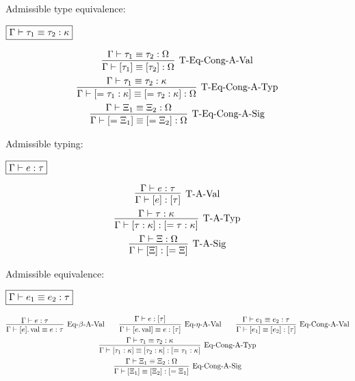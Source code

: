 Admissible type equivalence:

$\fbox{$\Gamma \vdash \tau_1 \equiv \tau_2: \kappa$}$

\begin{gather*}
  \infer[\text{T-Eq-Cong-A-Val}]{\Gamma \vdash [\tau_1] \equiv [\tau_2]: \Omega}{
    \Gamma \vdash \tau_1 \equiv \tau_2: \Omega
  }
  \\
  \infer[\text{T-Eq-Cong-A-Typ}]{\Gamma \vdash [= \tau_1: \kappa] \equiv [= \tau_2: \kappa]: \Omega}{
    \Gamma \vdash \tau_1 \equiv \tau_2: \kappa
  }
  \\
  \infer[\text{T-Eq-Cong-A-Sig}]{\Gamma \vdash [= \Xi_1] \equiv [= \Xi_2]: \Omega}{
    \Gamma \vdash \Xi_1 \equiv \Xi_2: \Omega
  }
\end{gather*}

Admissible typing:

$\fbox{$\Gamma \vdash e: \tau$}$

\begin{gather*}
  \infer[\text{T-A-Val}]{\Gamma \vdash [e]: [\tau]}{
    \Gamma \vdash e: \tau
  }
  \\
  \infer[\text{T-A-Typ}]{\Gamma \vdash [\tau: \kappa]: [= \tau: \kappa]}{
    \Gamma \vdash \tau: \kappa
  }
  \\
  \infer[\text{T-A-Sig}]{\Gamma \vdash [\Xi]: [= \Xi]}{
    \Gamma \vdash \Xi: \Omega
  }
\end{gather*}

Admissible equivalence:

$\fbox{$\Gamma \vdash e_1 \equiv e_2: \tau$}$

\begin{gather*}
  \infer[\text{Eq-$\beta$-A-Val}]{\Gamma \vdash [e].\symval \equiv e: \tau}{
    \Gamma \vdash e: \tau
  }
  \hspace{2em}
  \infer[\text{Eq-$\eta$-A-Val}]{\Gamma \vdash [e.\symval] \equiv e: [\tau]}{
    \Gamma \vdash e: [\tau]
  }
  \hspace{2em}
  \infer[\text{Eq-Cong-A-Val}]{\Gamma \vdash [e_1] \equiv [e_2]: [\tau]}{
    \Gamma \vdash e_1 \equiv e_2: \tau
  }
  \\
  \infer[\text{Eq-Cong-A-Typ}]{\Gamma \vdash [\tau_1: \kappa] \equiv [\tau_2: \kappa]: [= \tau_1: \kappa]}{
    \Gamma \vdash \tau_1 \equiv \tau_2: \kappa
  }
  \\
  \infer[\text{Eq-Cong-A-Sig}]{\Gamma \vdash [\Xi_1] \equiv [\Xi_2]: [= \Xi_1]}{
    \Gamma \vdash \Xi_1 \equiv \Xi_2: \Omega
  }
\end{gather*}


